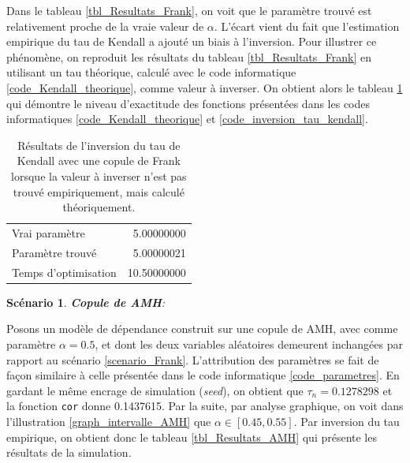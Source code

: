 \documentclass{article}
\newtheorem{scenario}{Scénario}
\begin{document}
	Dans le tableau \ref{tbl_Resultats_Frank}, on voit que le paramètre trouvé est relativement proche de la vraie valeur de $\alpha$. L'écart vient du fait que l'estimation empirique du tau de Kendall a ajouté un biais à l'inversion.
	Pour illustrer ce phénomène, on reproduit les résultats du tableau \ref{tbl_Resultats_Frank} en utilisant un tau théorique, calculé avec le code informatique \ref{code_Kendall_theorique}, comme valeur à inverser. 
	On obtient alors le tableau \ref{tbl_Resultats_Frank_th} qui démontre le niveau d'exactitude des fonctions présentées dans les codes informatiques \ref{code_Kendall_theorique} et \ref{code_inversion_tau_kendall}.
 	
 	\begin{table}[H]
 		\centering
 		\begin{tabular}{lr}

 			\hline
 			Vrai paramètre & 5.00000000 \\ 
 			Paramètre trouvé & 5.00000021 \\ 
 			Temps d'optimisation & 10.50000000 \\ 
 			\hline
 		\end{tabular}
 		\caption{Résultats de l'inversion du tau de Kendall avec une copule de Frank lorsque la valeur à inverser n'est pas trouvé empiriquement, mais calculé théoriquement.}
 	\label{tbl_Resultats_Frank_th}
 	\end{table}
 	
 	\begin{scenario}
 		\textbf{Copule de AMH}:
 		\label{scenario_AMH}
 	\end{scenario}
 	 Posons un modèle de dépendance construit sur une copule de AMH, avec comme paramètre $\alpha = 0.5$, et dont les deux variables aléatoires demeurent inchangées par rapport au scénario \ref{scenario_Frank}. 
 	 L'attribution des paramètres se fait de façon similaire à celle présentée dans le code informatique \ref{code_parametres}. En gardant le même encrage de simulation (\textit{seed}), on obtient que $\tau_n = 0.1278298$ et la fonction \texttt{cor} donne 0.1437615. Par la suite, par analyse graphique, on voit dans l'illustration \ref{graph_intervalle_AMH} que $\alpha \in [0.45, 0.55]$. Par inversion du tau empirique, on obtient donc le tableau \ref{tbl_Resultats_AMH} qui présente les résultats de la simulation.\\
 	 
\end{document}
